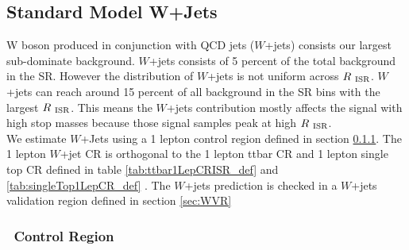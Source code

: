 \subsection{Standard Model W+Jets}
\label{sec:Bkg:wjet}

\indent W boson produced in conjunction with QCD jets ($W$+jets) consists our largest sub-dominate background.  $W$+jets consists of 5 percent of the total background in the SR.  However the distribution of $W$+jets is not uniform across $R_{~\mathrm{ISR}}$.  $W$+jets can reach around 15 percent of all background in the SR bins with the largest $R_{~\mathrm{ISR}}$.  This means the $W$+jets contribution mostly affects the signal with high stop masses because those signal samples peak at high $R_{~\mathrm{ISR}}$. \\
\indent We estimate $W$+Jets using a 1 lepton control region defined in section \ref{sec:WCR}.  The 1 lepton $W$+jet CR is orthogonal to the 1 lepton ttbar CR and 1 lepton single top CR defined in table \ref{tab:ttbar1LepCRISR_def} and \ref{tab:singleTop1LepCR_def} .  The $W$+jets prediction is checked in a $W$+jets validation region defined in section \ref{sec:WVR} \\



\subsubsection{\Wjets\ Control Region}
\label{sec:WCR}

